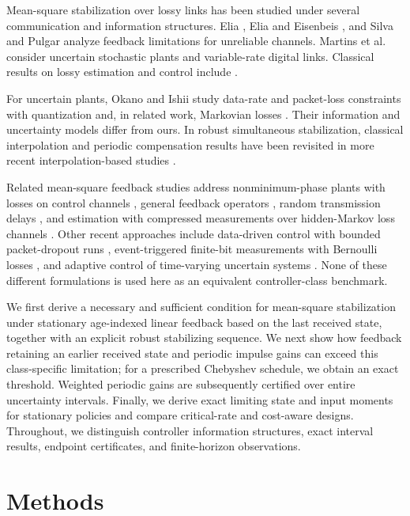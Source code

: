 \documentclass[preprint,12pt,numbers]{elsarticle}
\theoremstyle{definition}
\begin{document}
Mean-square stabilization over lossy links has been studied under several communication and information structures. Elia \citep{elia2005}, Elia and Eisenbeis \citep{eliaeisenbeis2011}, and Silva and Pulgar \citep{silvapulgar2011} analyze feedback limitations for unreliable channels. Martins et al.\ \citep{martins2006feedback} consider uncertain stochastic plants and variable-rate digital links. Classical results on lossy estimation and control include \citet{sinopoli2004,schenato2007,imer2006}.

For uncertain plants, Okano and Ishii study data-rate and packet-loss constraints with quantization and, in related work, Markovian losses \citep{okano2012lossy,okano2013,okano2014rate,okano2014markov,okano2015}. Their information and uncertainty models differ from ours. In robust simultaneous stabilization, classical interpolation and periodic compensation results \citep{tannenbaum1980,khargonekar1985periodic} have been revisited in more recent interpolation-based studies \citep{cui2024,wu2024}.

Related mean-square feedback studies address nonminimum-phase plants with losses on control channels \citep{lu2019}, general feedback operators \citep{li2024}, random transmission delays \citep{lu2025}, and estimation with compressed measurements over hidden-Markov loss channels \citep{song2026}. Other recent approaches include data-driven control with bounded packet-dropout runs \citep{chen2023}, event-triggered finite-bit measurements with Bernoulli losses \citep{ding2026}, and adaptive control of time-varying uncertain systems \citep{bartos2026}. None of these different formulations is used here as an equivalent controller-class benchmark.


We first derive a necessary and sufficient condition for mean-square stabilization under stationary age-indexed linear feedback based on the last received state, together with an explicit robust stabilizing sequence. We next show how feedback retaining an earlier received state and periodic impulse gains can exceed this class-specific limitation; for a prescribed Chebyshev schedule, we obtain an exact threshold. Weighted periodic gains are subsequently certified over entire uncertainty intervals. Finally, we derive exact limiting state and input moments for stationary policies and compare critical-rate and cost-aware designs. Throughout, we distinguish controller information structures, exact interval results, endpoint certificates, and finite-horizon observations.

\section{Methods}
\end{document}
